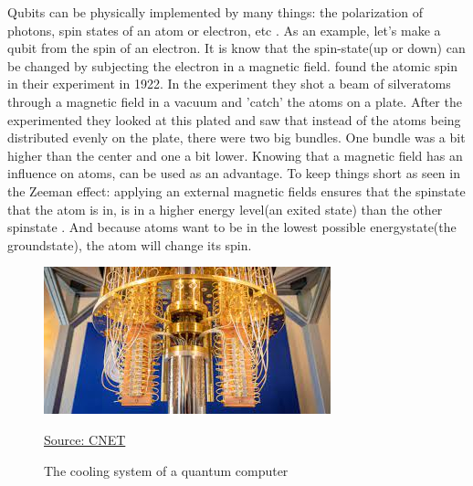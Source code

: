 Qubits can be physically implemented by many things: the polarization of photons, spin states of an atom or electron, etc \autocite{thequbit}.
As an example, let's make a qubit from the spin of an electron. It is know that the spin-state(up or down) can be changed by subjecting the electron in a magnetic field.
\textcite{Stern} found the atomic spin in their experiment in 1922. In the experiment they shot a beam of silveratoms through a magnetic field in a vacuum and 'catch' the atoms on a plate. After the experimented they looked at this plated and saw that instead of the atoms being distributed evenly on the plate, there were two big bundles.
One bundle was a bit higher than the center and one a bit lower. Knowing that a magnetic field has an influence on atoms, can be used as an advantage. To keep things short as seen in the Zeeman effect: applying an external magnetic fields ensures that the spinstate that the atom is in, is in a higher energy level(an exited state) than the other spinstate \autocite{Zeeman}.
And because atoms want to be in the lowest possible energystate(the groundstate), the atom will change its spin. 

\begin{figure} [h]
    \centering
    \includegraphics[width=\textwidth]{img/qcomputer.jpg}
        \caption{The cooling system of a quantum computer}
        \label{fig:Quantum computer cooling}
        \href{https://www.cnet.com/news/quantum-computing-research-helps-ibm-win-top-spot-in-patent-race/}{Source: CNET}
\end{figure}

